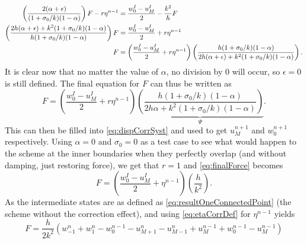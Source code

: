 \documentclass[dvipsnames]{article}
\begin{document}
\begin{align*}
    \left(\frac{2
    (\alpha + \epsilon)}{(1+\sigma_0/k)(1-\alpha)}\right)F - r \eta^{n-1} &= \frac{w_0^{I} - u_M^{I}}{2} - \frac{k^2}{h}F\\
    \left(\frac{2h
    (\alpha + \epsilon) + k^2(1+\sigma_0/k)(1-\alpha)}{h(1+\sigma_0/k)(1-\alpha)}\right)F &= \frac{w_0^{I} - u_M^{I}}{2}+r\eta^{n-1}\\
    F &= \left(\frac{w_0^{I} - u_M^{I}}{2}+r\eta^{n-1}\right)\left(\frac{h(1+\sigma_0/k)(1-\alpha)}{2h (\alpha + \epsilon) + k^2(1+\sigma_0/k)(1-\alpha)}\right).
\end{align*}
It is clear now that no matter the value of $\alpha$, no division by 0 will occur, so $\epsilon = 0$ is still defined. The final equation for $F$ can thus be written as
\begin{equation}\label{eq:finalForce}
    F = \left(\frac{w_0^{I} - u_M^{I}}{2}+r\eta^{n-1}\right)\underbrace{\left(\frac{h(1+\sigma_0/k)(1-\alpha)}{2h\alpha + k^2(1+\sigma_0/k)(1-\alpha)}\right)}_{\Psi}.
\end{equation}
This can then be filled into \eqref{eq:dispCorrSyst} and used to get $u_M^{n+1}$ and $w_0^{n+1}$ respectively. Using $\alpha = 0$ and $\sigma_0 = 0$ as a test case to see what would happen to the scheme at the inner boundaries when they perfectly overlap (and without damping, just restoring force), we get that $r = 1$ and \eqref{eq:finalForce} becomes
\begin{equation}
    F = \left(\frac{w_0^{I} - u_M^{I}}{2}+\eta^{n-1}\right)\left(\frac{h}{k^2}\right).
\end{equation}
As the intermediate states are as defined as \eqref{eq:resultOneConnectedPoint} (the scheme without the correction effect), %
and %
using \eqref{eq:etaCorrDef} for $\eta^{n-1}$ yields
\begin{equation}
    F = \frac{h}{2k^2}\left(w_{-1}^n + w_1^n - w_0^{n-1} - u_{M+1}^n-u_{M-1}^n + u_M^{n-1} + w_0^{n-1} - u_M^{n-1}\right)
\end{equation}
\end{document}
